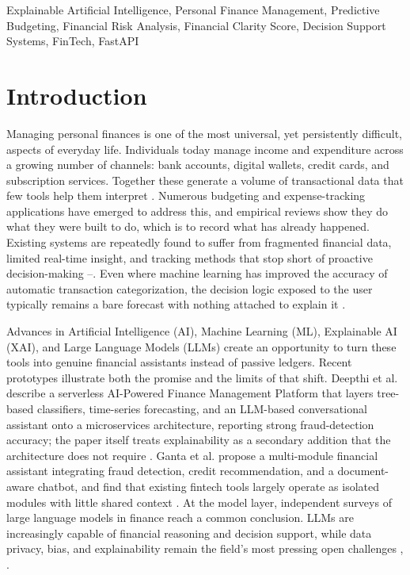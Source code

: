 \documentclass[conference]{IEEEtran}
\begin{document}
\begin{IEEEkeywords}
Explainable Artificial Intelligence, Personal Finance Management, Predictive Budgeting, Financial Risk Analysis, Financial Clarity Score, Decision Support Systems, FinTech, FastAPI
\end{IEEEkeywords}

\section{Introduction}

Managing personal finances is one of the most universal, yet persistently difficult, aspects of everyday life. Individuals today manage income and expenditure across a growing number of channels: bank accounts, digital wallets, credit cards, and subscription services. Together these generate a volume of transactional data that few tools help them interpret \cite{badiger2026spendai}. Numerous budgeting and expense-tracking applications have emerged to address this, and empirical reviews show they do what they were built to do, which is to record what has already happened. Existing systems are repeatedly found to suffer from fragmented financial data, limited real-time insight, and tracking methods that stop short of proactive decision-making \cite{deepthi2026aipowered}--\cite{ganta2025multimodule}. Even where machine learning has improved the accuracy of automatic transaction categorization, the decision logic exposed to the user typically remains a bare forecast with nothing attached to explain it \cite{deepthi2026aipowered}.

Advances in Artificial Intelligence (AI), Machine Learning (ML), Explainable AI (XAI), and Large Language Models (LLMs) create an opportunity to turn these tools into genuine financial assistants instead of passive ledgers. Recent prototypes illustrate both the promise and the limits of that shift. Deepthi et al. describe a serverless AI-Powered Finance Management Platform that layers tree-based classifiers, time-series forecasting, and an LLM-based conversational assistant onto a microservices architecture, reporting strong fraud-detection accuracy; the paper itself treats explainability as a secondary addition that the architecture does not require \cite{deepthi2026aipowered}. Ganta et al. propose a multi-module financial assistant integrating fraud detection, credit recommendation, and a document-aware chatbot, and find that existing fintech tools largely operate as isolated modules with little shared context \cite{ganta2025multimodule}. At the model layer, independent surveys of large language models in finance reach a common conclusion. LLMs are increasingly capable of financial reasoning and decision support, while data privacy, bias, and explainability remain the field's most pressing open challenges \cite{nie2024survey}, \cite{khan2025bridging}.
\end{document}
